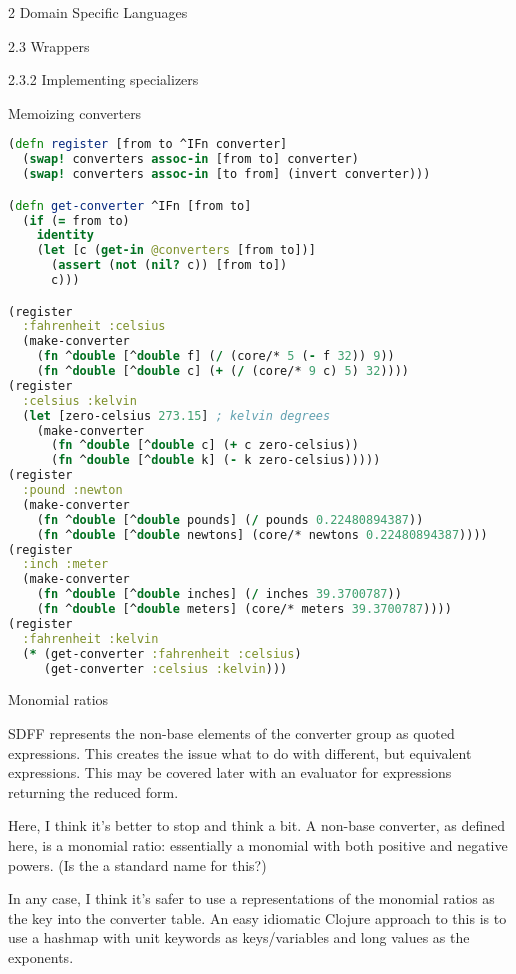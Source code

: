 \documentclass[12pt]{PalisadesLakesBook}
\begin{document}
\begin{plSection}{}
\begin{plSection}{2 Domain Specific Languages}
\begin{plSection}{2.3 Wrappers}
\begin{plSection}{2.3.2 Implementing specializers}
\begin{plSection}{Memoizing converters}
\begin{plListing}
\begin{lstlisting}[language=clojure]
(defn register [from to ^IFn converter]
  (swap! converters assoc-in [from to] converter)
  (swap! converters assoc-in [to from] (invert converter)))

(defn get-converter ^IFn [from to]
  (if (= from to)
    identity
    (let [c (get-in @converters [from to])]
      (assert (not (nil? c)) [from to])
      c)))

(register 
  :fahrenheit :celsius 
  (make-converter 
    (fn ^double [^double f] (/ (core/* 5 (- f 32)) 9))
    (fn ^double [^double c] (+ (/ (core/* 9 c) 5) 32))))
(register 
  :celsius :kelvin
  (let [zero-celsius 273.15] ; kelvin degrees
    (make-converter 
      (fn ^double [^double c] (+ c zero-celsius))
      (fn ^double [^double k] (- k zero-celsius)))))
(register
  :pound :newton
  (make-converter 
    (fn ^double [^double pounds] (/ pounds 0.22480894387))
    (fn ^double [^double newtons] (core/* newtons 0.22480894387))))
(register
  :inch :meter
  (make-converter 
    (fn ^double [^double inches] (/ inches 39.3700787))
    (fn ^double [^double meters] (core/* meters 39.3700787))))
(register
  :fahrenheit :kelvin 
  (* (get-converter :fahrenheit :celsius) 
     (get-converter :celsius :kelvin)))
\end{lstlisting}
\end{plListing}
\end{plSection}%
\begin{plSection}{Monomial ratios}

SDFF represents the non-base elements of the converter group
as quoted expressions. This creates the issue what to do with
different, but equivalent expressions. This may be covered 
later with an evaluator for expressions returning the reduced
form.
 
Here, I think it's better to stop and think a bit.
A non-base converter, as defined here, is a monomial ratio:
essentially a monomial
with both positive and negative powers.
(Is the a standard name for this?)

In any case, I think it's safer to use a representations
of the monomial ratios as the key into the converter table.
An easy idiomatic Clojure approach to this is to use a hashmap
with unit keywords as keys/variables and 
long values as the exponents. 


\end{plSection}
\end{plSection}
\end{plSection}
\end{plSection}
\end{plSection}
\end{document}
